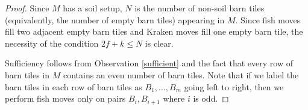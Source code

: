 \documentclass{article}
\begin{document}
\begin{proof}
    Since $M$ has a soil setup, $N$ is the number of non-soil barn tiles (equivalently, the number of empty barn tiles) appearing in $M$. Since fish moves fill two adjacent empty barn tiles and Kraken moves fill one empty barn tile, the necessity of the condition $2f+k\leq N$ is clear.
    
    Sufficiency follows from Observation \ref{sufficient} and the fact that every row of barn tiles in $M$ contains an even number of barn tiles. Note that if we label the barn tiles in each row of barn tiles as $B_1,\dots,B_m$ going left to right, then we perform fish moves only on pairs $B_i,B_{i+1}$ where $i$ is odd.
%
%
\end{proof}
\end{document}
